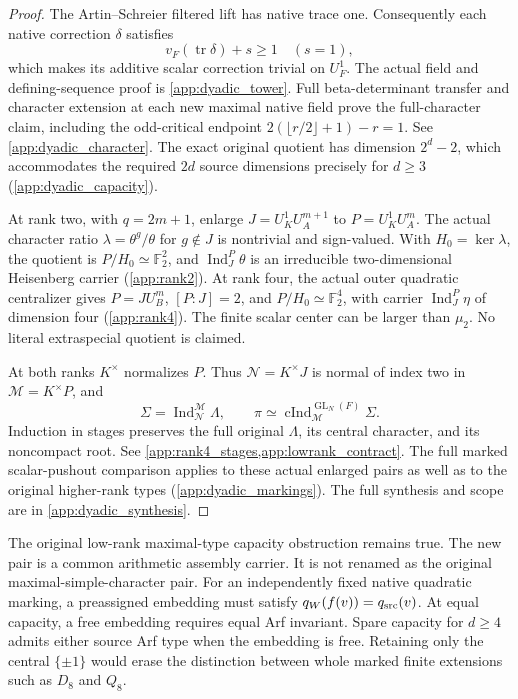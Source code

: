 \documentclass[11pt]{amsart}
\theoremstyle{definition}
\theoremstyle{remark}
\newcommand{\FF}{\mathbb F}
\newcommand{\GL}{\operatorname{GL}}
\newcommand{\Ind}{\operatorname{Ind}}
\newcommand{\cInd}{\operatorname{cInd}}
\begin{document}
\begin{proof}
The Artin--Schreier filtered lift has native trace one. Consequently
each native correction \(\delta\) satisfies
\[
v_F(\operatorname{tr}\delta)+s\ge1 \quad (s=1),
\]
which makes its additive scalar correction trivial on \(U_F^1\).
The actual field and defining-sequence proof is
\cref{app:dyadic_tower}. Full beta-determinant transfer and character
extension at each new maximal native field prove the full-character
claim, including the odd-critical endpoint
\(2(\lfloor r/2\rfloor+1)-r=1\). See \cref{app:dyadic_character}.
The exact original quotient has dimension \(2^d-2\), which accommodates
the required \(2d\) source dimensions precisely for \(d\ge3\)
(\cref{app:dyadic_capacity}).

At rank two, with \(q=2m+1\), enlarge
\(J=U_K^1U_A^{m+1}\) to \(P=U_K^1U_A^m\). The actual character
ratio \(\lambda=\theta^g/\theta\) for \(g\notin J\) is nontrivial
and sign-valued. With \(H_0=\ker\lambda\), the quotient is
\(P/H_0\simeq\FF_2^2\), and \(\Ind_J^P\theta\) is an
irreducible two-dimensional Heisenberg carrier
(\cref{app:rank2}). At rank four, the actual outer quadratic
centralizer gives \(P=J U_B^m\), \([P:J]=2\), and
\(P/H_0\simeq\FF_2^4\), with carrier \(\Ind_J^P\eta\) of
dimension four (\cref{app:rank4}). The finite scalar center can be
larger than \(\mu_2\). No literal extraspecial quotient is claimed.

At both ranks \(K^\times\) normalizes \(P\). Thus
\(\mathcal N=K^\times J\) is normal of index two in
\(\mathcal M=K^\times P\), and
\[
\Sigma=\Ind_{\mathcal N}^{\mathcal M}\Lambda,
\qquad
\pi\simeq\cInd_{\mathcal M}^{\GL_N(F)}\Sigma.
\]
Induction in stages preserves the full original \(\Lambda\), its
central character, and its noncompact root. See
\cref{app:rank4_stages,app:lowrank_contract}. The full marked
scalar-pushout comparison applies to these actual enlarged pairs as
well as to the original higher-rank types (\cref{app:dyadic_markings}).
The full synthesis and scope are in \cref{app:dyadic_synthesis}.
\end{proof}

The original low-rank maximal-type capacity obstruction remains true.
The new pair is a common arithmetic assembly carrier. It is not renamed
as the original maximal-simple-character pair. For an independently
fixed native quadratic marking, a preassigned embedding must satisfy
\(q_W(f(v))=q_{\rm src}(v)\). At equal capacity, a free embedding
requires equal Arf invariant. Spare capacity for \(d\ge4\) admits
either source Arf type when the embedding is free. Retaining only the
central \(\{\pm1\}\) would erase the distinction between whole marked
finite extensions such as \(D_8\) and \(Q_8\).
\end{document}

